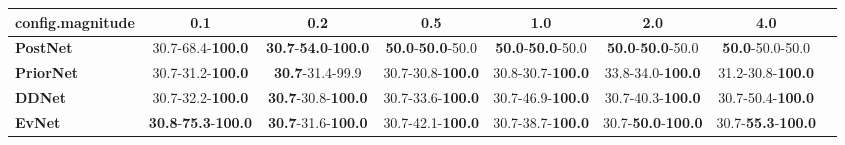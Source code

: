 \begin{tabular}{lccccccc}
\toprule
\textbf{config.magnitude} &                                         0.1 &                                         0.2 &                               0.5 &                               1.0 &                                2.0 &                                4.0 \\
\midrule
\textbf{PostNet } &                    30.7-68.4-\textbf{100.0} &  \textbf{30.7}-\textbf{54.0}-\textbf{100.0} &  \textbf{50.0}-\textbf{50.0}-50.0 &  \textbf{50.0}-\textbf{50.0}-50.0 &   \textbf{50.0}-\textbf{50.0}-50.0 &            \textbf{50.0}-50.0-50.0 \\
\textbf{PriorNet} &                    30.7-31.2-\textbf{100.0} &                     \textbf{30.7}-31.4-99.9 &          30.7-30.8-\textbf{100.0} &          30.8-30.7-\textbf{100.0} &           33.8-34.0-\textbf{100.0} &           31.2-30.8-\textbf{100.0} \\
\textbf{DDNet   } &                    30.7-32.2-\textbf{100.0} &           \textbf{30.7}-30.8-\textbf{100.0} &          30.7-33.6-\textbf{100.0} &          30.7-46.9-\textbf{100.0} &           30.7-40.3-\textbf{100.0} &           30.7-50.4-\textbf{100.0} \\
\textbf{EvNet   } &  \textbf{30.8}-\textbf{75.3}-\textbf{100.0} &           \textbf{30.7}-31.6-\textbf{100.0} &          30.7-42.1-\textbf{100.0} &          30.7-38.7-\textbf{100.0} &  30.7-\textbf{50.0}-\textbf{100.0} &  30.7-\textbf{55.3}-\textbf{100.0} \\
\bottomrule
\end{tabular}
